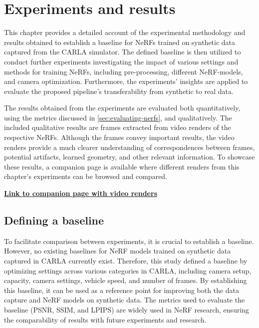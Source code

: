 \chapter{Experiments and results} \label{sec:experiments-and-results}
This chapter provides a detailed account of the experimental methodology and results obtained to establish a baseline for NeRFs trained on synthetic data captured from the CARLA simulator. The defined baseline is then utilized to conduct further experiments investigating the impact of various settings and methods for training NeRFs, including pre-processing, different NeRF-models, and camera optimization. Furthermore, the experiments’ insights are applied to evaluate the proposed pipeline’s transferability from synthetic to real data.

The results obtained from the experiments are evaluated both quantitatively, using the metrics discussed in \autoref{sec:evaluating-nerfs}, and qualitatively. The included qualitative results are frames extracted from video renders of the respective NeRFs. Although the frames convey important results, the video renders provide a much clearer understanding of correspondences between frames, potential artifacts, learned geometry, and other relevant information. To showcase these results, a companion page is available where different renders from this chapter's experiments can be browsed and compared.

\vspace{2mm} %
\noindent \textbf{\href{}{Link to companion page with video renders}}

\section{Defining a baseline}

To facilitate comparison between experiments, it is crucial to establish a baseline. However, no existing baselines for NeRF models trained on synthetic data captured in CARLA currently exist. Therefore, this study defined a baseline by optimizing settings across various categories in CARLA, including camera setup, capacity, camera settings, vehicle speed, and number of frames. By establishing this baseline, it can be used as a reference point for improving both the data capture and NeRF models on synthetic data. The metrics used to evaluate the baseline (PSNR, SSIM, and LPIPS) are widely used in NeRF research, ensuring the comparability of results with future experiments and research.


